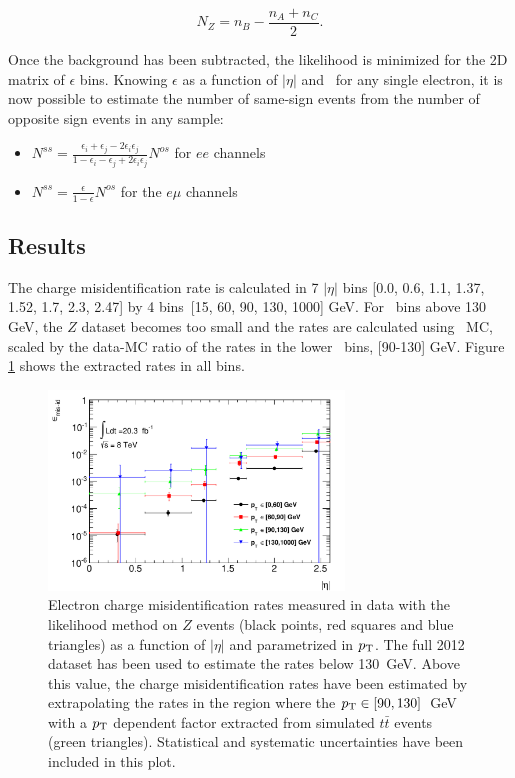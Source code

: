\begin{equation}
N_Z=n_B-\frac{n_A+n_C}{2}.
\end{equation}
  
 Once the background has been subtracted, the likelihood is minimized for the 2D matrix of  $\epsilon$ bins. Knowing $\epsilon$ as a function of $|\eta|$ and \pt\ for any single electron, it is now possible to estimate the number of same-sign events from the number of opposite sign events in any sample:

\begin{itemize}
\item $N^{ss} = \frac{\epsilon_i +\epsilon_j -2\epsilon_i \epsilon_j}{1-\epsilon_i -\epsilon_j +2\epsilon_i \epsilon_j} N^{os}$ for $ee$ channels
\item $N^{ss} = \frac{\epsilon}{1-\epsilon} N^{os}$ for the $e\mu$ channels
\end{itemize}


\subsection{Results}

The charge misidentification rate is calculated in 7 $|\eta|$ bins [0.0, 0.6, 1.1, 1.37, 1.52, 1.7, 2.3, 2.47] by 4 \pt bins\ [15, 60, 90, 130, 1000] GeV. For \pt\ bins above 130 GeV, the $Z$ dataset becomes too small and the rates are calculated using \ttbar\ MC, scaled by the data-MC ratio of the rates in the lower \pt\ bins, [90-130] GeV. Figure \ref{figure:background_cf} shows the extracted rates in all bins.

\begin{figure}[ht!]
\centering
\includegraphics[width=0.7\textwidth]{figs/qmis/Rates2D}
  \caption{Electron charge misidentification rates  measured in data with the likelihood method  on $Z$ events (black points, red squares and blue triangles) as a function of $|\eta|$ and parametrized in $p_{\rm T}$. The full 2012 dataset has been used to estimate the rates below 130~GeV.   Above this value, the charge misidentification rates have been estimated by extrapolating the rates in the region where the $p_{\rm T}\in[90,130]$~GeV with a $p_{\rm T}$ dependent factor extracted from simulated $t\bar t$ events (green triangles). Statistical and systematic uncertainties  have been included in this plot. \label{figure:background_cf}}
\end{figure}


